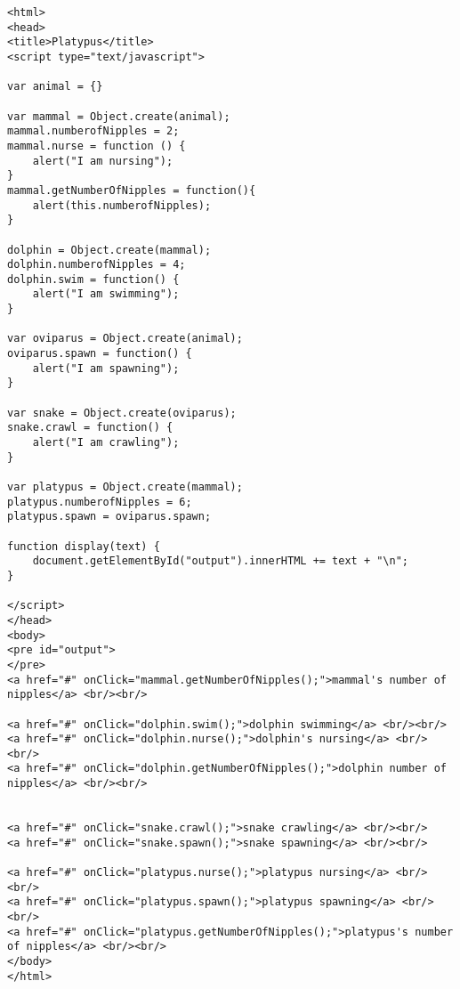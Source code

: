 \begin{verbatim}
<html>
<head>
<title>Platypus</title>
<script type="text/javascript">

var animal = {}

var mammal = Object.create(animal);
mammal.numberofNipples = 2;
mammal.nurse = function () {
	alert("I am nursing");
}
mammal.getNumberOfNipples = function(){
	alert(this.numberofNipples);
}

dolphin = Object.create(mammal);
dolphin.numberofNipples = 4;
dolphin.swim = function() {
	alert("I am swimming");
}

var oviparus = Object.create(animal);
oviparus.spawn = function() {
	alert("I am spawning");
}

var snake = Object.create(oviparus);
snake.crawl = function() {
	alert("I am crawling");
}

var platypus = Object.create(mammal);
platypus.numberofNipples = 6;
platypus.spawn = oviparus.spawn;

function display(text) {
	document.getElementById("output").innerHTML += text + "\n";
}

</script>
</head>
<body>
<pre id="output">
</pre>
<a href="#" onClick="mammal.getNumberOfNipples();">mammal's number of nipples</a> <br/><br/>

<a href="#" onClick="dolphin.swim();">dolphin swimming</a> <br/><br/>
<a href="#" onClick="dolphin.nurse();">dolphin's nursing</a> <br/><br/>
<a href="#" onClick="dolphin.getNumberOfNipples();">dolphin number of nipples</a> <br/><br/>


<a href="#" onClick="snake.crawl();">snake crawling</a> <br/><br/>
<a href="#" onClick="snake.spawn();">snake spawning</a> <br/><br/>

<a href="#" onClick="platypus.nurse();">platypus nursing</a> <br/><br/>
<a href="#" onClick="platypus.spawn();">platypus spawning</a> <br/><br/>
<a href="#" onClick="platypus.getNumberOfNipples();">platypus's number of nipples</a> <br/><br/>
</body>
</html>
\end{verbatim}

